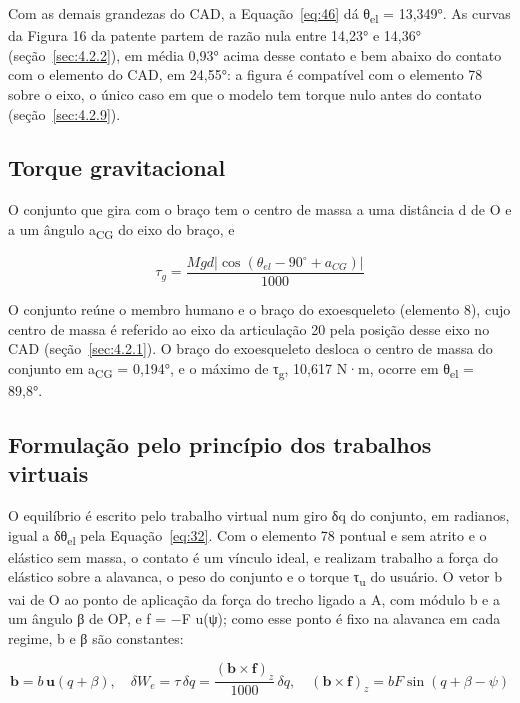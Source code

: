 Com as demais grandezas do CAD, a Equação~\eqref{eq:46} dá θ\textsubscript{el} = 13,349°. As curvas da Figura 16 da patente partem de razão nula entre 14,23° e 14,36° (seção~\ref{sec:4.2.2}), em média 0,93° acima desse contato e bem abaixo do contato com o elemento do CAD, em 24,55°: a figura é compatível com o elemento 78 sobre o eixo, o único caso em que o modelo tem torque nulo antes do contato (seção~\ref{sec:4.2.9}).

\subsection{Torque gravitacional}\label{sec:3.2.8}

O conjunto que gira com o braço tem o centro de massa a uma distância d de O e a um ângulo a\textsubscript{CG} do eixo do braço, e

\begin{equation}
  \tau_{g} = \frac{Mgd\left| \cos{(\theta_{el} - 90^{\circ} + a_{CG})} \right|}{1000}
  \label{eq:47}
\end{equation}

O conjunto reúne o membro humano e o braço do exoesqueleto (elemento 8), cujo centro de massa é referido ao eixo da articulação 20 pela posição desse eixo no CAD (seção~\ref{sec:4.2.1}). O braço do exoesqueleto desloca o centro de massa do conjunto em a\textsubscript{CG} = 0,194°, e o máximo de τ\textsubscript{g}, 10,617 N·m, ocorre em θ\textsubscript{el} = 89,8°.

\subsection{Formulação pelo princípio dos trabalhos virtuais}\label{sec:3.2.9}

O equilíbrio é escrito pelo trabalho virtual num giro δq do conjunto, em radianos, igual a δθ\textsubscript{el} pela Equação~\eqref{eq:32}. Com o elemento 78 pontual e sem atrito e o elástico sem massa, o contato é um vínculo ideal, e realizam trabalho a força do elástico sobre a alavanca, o peso do conjunto e o torque τ\textsubscript{u} do usuário. O vetor b vai de O ao ponto de aplicação da força do trecho ligado a A, com módulo b e a um ângulo β de OP, e f = −F u(ψ); como esse ponto é fixo na alavanca em cada regime, b e β são constantes:

\begin{equation}
  \mathbf{b} = b\,\mathbf{u}(q + \beta),\quad\delta W_{e} = \tau\,\delta q = \frac{{(\mathbf{b} \times \mathbf{f})}_{z}}{1000}\,\delta q,\quad{(\mathbf{b} \times \mathbf{f})}_{z} = bF\sin{(q + \beta - \psi)}
  \label{eq:48}
\end{equation}

